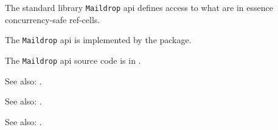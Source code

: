 
The standard library {\tt Maildrop} api defines access to what are in essence concurrency-safe ref-cells.

The {\tt Maildrop} api is implemented by the  package.

The {\tt Maildrop} api source code is in .

See also: .

See also: .

See also: .




